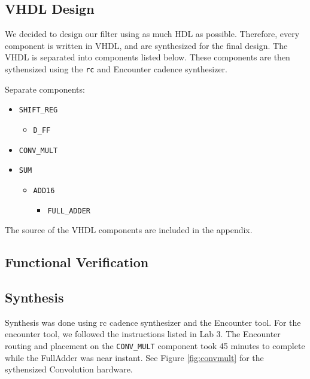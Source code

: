 \subsection{VHDL Design}
We decided to design our filter using as much HDL as possible.  Therefore, every component is written in VHDL, and are synthesized for the final design. The VHDL is separated into components listed below.  These components are then sythensized using the \texttt{rc} and Encounter cadence synthesizer.  

Separate components:
\begin{itemize}
\item \verb=SHIFT_REG=
	\begin{itemize}
		\item \verb=D_FF=
	\end{itemize}
\item \verb=CONV_MULT=
\item \verb=SUM=
	\begin{itemize}
		\item \verb=ADD16=
		\begin{itemize}
			\item \verb=FULL_ADDER=
		\end{itemize}
	\end{itemize}
\end{itemize}

The source of the VHDL components are included in the appendix.  

\subsection{Functional Verification}



\subsection{Synthesis}
Synthesis was done using rc cadence synthesizer and the Encounter tool.  For the encounter tool, we followed the instructions listed in Lab 3.  The Encounter routing and placement on the \verb=CONV_MULT= component took 45 minutes to complete while the FullAdder was near instant.  See Figure \ref{fig:convmult} for the sythensized Convolution hardware.


